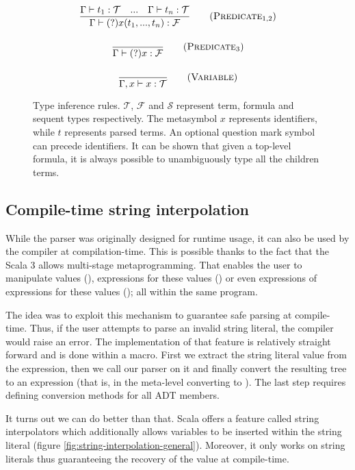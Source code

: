 \begin{figure}[H]
\begin{framed}
\begin{gather}
  \frac{\Gamma \vdash t_1: \mathcal{T} \quad ... \quad \Gamma \vdash t_n: \mathcal{T}}{\Gamma \vdash (?)x(t_1, ..., t_n): \mathcal{F}}
  \tag{$\textsc{Predicate}_{1,2}$} \\[1em]
  \frac{}{\Gamma \vdash (?)x: \mathcal{F}} \tag{$\textsc{Predicate}_3$} \\[1em]
  \frac{}{\Gamma, x \vdash x: \mathcal{T}} \tag{\textsc{Variable}}
  \end{gather}
  \end{framed}
  \caption[Type inference rules]{Type inference rules. $\mathcal{T}$, $\mathcal{F}$ and $\mathcal{S}$ represent term, formula and sequent types respectively. The metasymbol $x$ represents identifiers, while $t$ represents parsed terms. An optional question mark symbol can precede identifiers. It can be shown that given a top-level formula, it is always possible to unambiguously type all the children terms.}
  \label{fig:typing-rules}
\end{figure}

\subsection{Compile-time string interpolation}

While the parser was originally designed for runtime usage, it can also be used by the compiler at compilation-time. This is possible thanks to the fact that the Scala 3 allows multi-stage metaprogramming. That enables the user to manipulate values (), expressions for these values () or even expressions of expressions for these values (); all within the same program.

The idea was to exploit this mechanism to guarantee safe parsing at compile-time. Thus, if the user attempts to parse an invalid string literal, the compiler would raise an error. The implementation of that feature is relatively straight forward and is done within a macro. First we extract the string literal value from the expression, then we call our parser on it and finally convert the resulting tree to an expression (that is, in the meta-level converting  to ). The last step requires defining conversion methods for all ADT members.

It turns out we can do better than that. Scala offers a feature called string interpolators which additionally allows variables to be inserted within the string literal (figure \ref{fig:string-interpolation-general}). Moreover, it only works on string literals thus guaranteeing the recovery of the value at compile-time.

